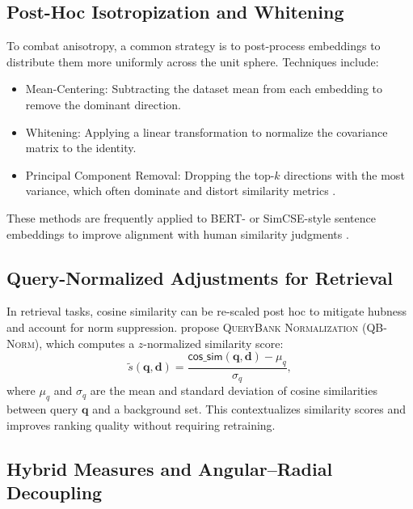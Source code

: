 \documentclass[11pt]{article}
\newcommand{\cossim}{\textsf{cos\_sim}}
\begin{document}
\subsection{Post-Hoc Isotropization and Whitening}

To combat anisotropy, a common strategy is to post-process embeddings to distribute them more uniformly across the unit sphere. Techniques include:
\begin{itemize}
	\setlength\leftskip{-1em} 
	\item {Mean-Centering}: Subtracting the dataset mean from each embedding to remove the dominant direction.
	\item {Whitening}: Applying a linear transformation to normalize the covariance matrix to the identity.
	\item {Principal Component Removal}: Dropping the top-$k$ directions with the most variance, which often dominate and distort similarity metrics \citep{liang_2021_LearningRemoveIsotropic}.
\end{itemize}
These methods are frequently applied to BERT- or SimCSE-style sentence embeddings to improve alignment with human similarity judgments \citep{gao_2021_SimCSESimpleContrastive}.

\subsection{Query-Normalized Adjustments for Retrieval}

In retrieval tasks, cosine similarity can be re-scaled post hoc to mitigate hubness and account for norm suppression. \citet{bogolin_2022_CrossModalRetrieval} propose \textsc{{QueryBank Normalization (QB-Norm)}}, which computes a $z$-normalized similarity score:
\begin{equation*}
	\tilde{s}(\mathbf{q}, \mathbf{d}) = \frac{\cossim(\mathbf{q}, \mathbf{d}) - \mu_q}{\sigma_q},
\end{equation*}
where $\mu_q$ and $\sigma_q$ are the mean and standard deviation of cosine similarities between query $\mathbf{q}$ and a background set. This contextualizes similarity scores and improves ranking quality without requiring retraining.

\subsection{Hybrid Measures and Angular--Radial Decoupling}
\end{document}
